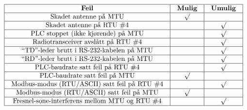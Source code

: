 $$\vbox{\offinterlineskip
\halign{\strut
\vrule \quad\hfil # \ \hfil & 
\vrule \quad\hfil # \ \hfil & 
\vrule \quad\hfil # \ \hfil \vrule \cr
\noalign{\hrule}
%
{\bf Feil} & {\bf Mulig} & {\bf Umulig} \cr
%
\noalign{\hrule}
%
Skadet antenne på MTU & $\surd$ &  \cr
%
\noalign{\hrule}
%
Skadet antenne på RTU \#4 &  & $\surd$ \cr
%
\noalign{\hrule}
%
PLC stoppet (ikke kjørende) på MTU &  & $\surd$ \cr
%
\noalign{\hrule}
%
Radiotransceiver avslått på RTU \#4 &  & $\surd$ \cr
%
\noalign{\hrule}
%
``TD''-leder brutt i RS-232-kabelen på MTU &  & $\surd$ \cr
%
\noalign{\hrule}
%
``RD''-leder brutt i RS-232-kabelen på MTU &  & $\surd$ \cr
%
\noalign{\hrule}
%
PLC-baudrate satt feil på RTU \#4 &  & $\surd$ \cr
%
\noalign{\hrule}
%
PLC-baudrate satt feil på MTU & $\surd$ &  \cr
%
\noalign{\hrule}
%
Modbus-modus (RTU/ASCII) satt feil på RTU \#4 &  & $\surd$ \cr
%
\noalign{\hrule}
%
Modbus-modus (RTU/ASCII) satt feil på MTU & $\surd$ &  \cr
%
\noalign{\hrule}
%
Fresnel-sone-interferens mellom MTU og RTU \#4 &  & $\surd$ \cr
%
\noalign{\hrule}
} %
}$$ %



